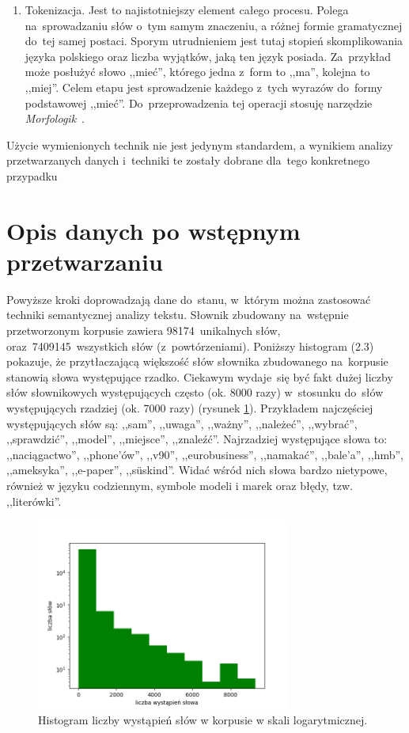 \documentclass[pl]{minipw} %
\begin{document}
\begin{enumerate}
\item Tokenizacja. Jest to najistotniejszy element całego procesu. Polega na~sprowadzaniu słów o~tym samym znaczeniu, a różnej formie gramatycznej do~tej samej postaci. Sporym utrudnieniem jest tutaj stopień skomplikowania języka polskiego oraz liczba wyjątków, jaką ten język posiada. Za~przykład może posłużyć słowo ,,mieć'', którego jedna z~form to ,,ma'', kolejna to ,,miej''. Celem etapu jest sprowadzenie każdego z~tych wyrazów do~formy podstawowej ,,mieć''. Do~przeprowadzenia tej operacji stosuję narzędzie \textit{Morfologik}~\cite{morfologik}.
\end{enumerate}

Użycie wymienionych technik nie jest jedynym standardem, a wynikiem analizy przetwarzanych danych i~techniki te zostały dobrane dla~tego konkretnego przypadku

\section{Opis danych po wstępnym przetwarzaniu}

Powyższe kroki doprowadzają dane do~stanu, w~którym można zastosować techniki semantycznej analizy tekstu. Słownik zbudowany na~wstępnie przetworzonym korpusie zawiera 98174~unikalnych słów, oraz~7409145~wszystkich słów (z~powtórzeniami). Poniższy histogram (2.3) pokazuje, że przytłaczającą większość słów słownika zbudowanego na~korpusie stanowią słowa występujące rzadko. Ciekawym wydaje~się być fakt dużej liczby słów słownikowych występujących często (ok. 8000 razy) w~stosunku do~słów występujących rzadziej (ok. 7000 razy) (rysunek \ref{fig:hist2}). Przykładem najczęściej występujących słów są: ,,sam'', ,,uwaga'', ,,ważny'', ,,należeć'', ,,wybrać'', ,,sprawdzić'', ,,model'', ,,miejsce'', ,,znaleźć''. Najrzadziej występujące słowa to: ,,naciągactwo'', ,,phone’ów'', ,,v90'', ,,eurobusiness'', ,,namakać'', ,,bale’a'', ,,hmb'', ,,ameksyka'', ,,e-paper'', ,,süskind''. Widać wśród nich słowa bardzo nietypowe, również w języku codziennym, symbole modeli i marek oraz błędy, tzw. ,,literówki''.

\begin{figure}[H]
	\centering
	\includegraphics[width=0.75\textwidth]{img/words_hist_log.png}
	\caption{Histogram liczby wystąpień słów w korpusie w skali logarytmicznej.}
	\label{fig:hist2}
\end{figure}
\end{document}
